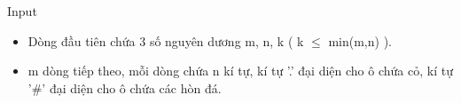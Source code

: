 Input  
\begin{itemize}
	\item     Dòng đầu tiên chứa 3 số nguyên dương m, n, k ( k  $\le$  min(m,n) ).   
	\item     m dòng tiếp theo, mỗi dòng chứa n kí tự, kí tự '.' đại diện cho ô chứa cỏ, kí tự '\#' đại diện cho ô chứa các hòn đá.   
\end{itemize}